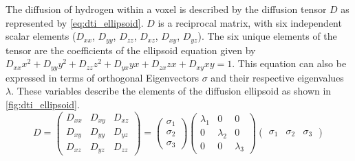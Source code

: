 The diffusion of hydrogen within a voxel is described by the diffusion tensor $D$ as represented by \equationname \ref{eq:dti_ellipsoid}. $D$ is a reciprocal matrix, with six independent scalar elements ($D_{xx}$, $D_{yy}$, $D_{zz}$, $D_{xz}$, $D_{xy}$, $D_{yz}$). The six unique elements of the tensor are the coefficients of the ellipsoid equation given by $D_{xx}x^2 + D_{yy}y^2 + D_{zz}z^2 + D_{yx}yx + D_{zx}zx + D_{xy}xy = 1$. This equation can also be expressed in terms of orthogonal Eigenvectors $\sigma$ and their respective eigenvalues $\lambda$. These variables describe the elements of the diffusion ellipsoid as shown in \figurename \ref{fig:dti_ellipsoid}.
\begin{equation}
D=\begin{pmatrix}
	D_{xx}       & D_{xy} & D_{xz} \\
	D_{xy}       & D_{yy} & D_{yz}  \\
	D_{xz}       & D_{yz} & D_{zz} 
\end{pmatrix}=
\begin{pmatrix}
\sigma_1\\
\sigma_2\\
\sigma_3
\end{pmatrix}
\begin{pmatrix}
\lambda_1 & 0 & 0 \\
0 & \lambda_2 & 0  \\
0 & 0 & \lambda_3 
\end{pmatrix}
\begin{pmatrix}
\sigma_1 & \sigma_2 & \sigma_3
\end{pmatrix}
\label{eq:dti_ellipsoid}
\end{equation}

